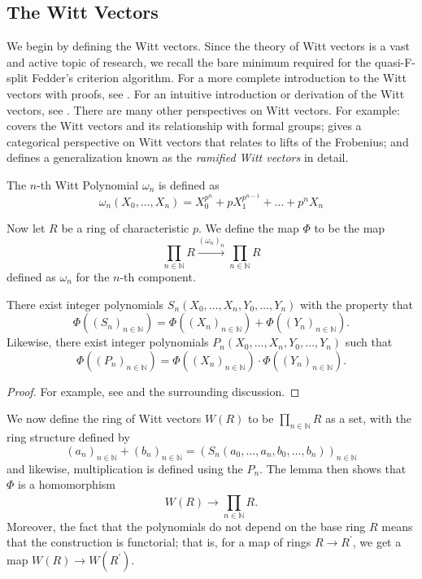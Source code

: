 
\subsection{The Witt Vectors}

We begin by defining the Witt vectors. 
Since the theory of Witt vectors is a vast and active topic of research,
we recall the bare minimum 
required for the quasi-F-split Fedder's criterion algorithm.
For a more complete introduction to the Witt vectors with proofs, 
see \cite{rabinoff-2014-witt-vec}.
For an intuitive introduction or derivation of the Witt vectors, see
\cite{kim-2017-witt-vec}.
There are many other perspectives on Witt vectors. 
For example:
\cite[Chapter~17]{hazewinkel-1978-formal-groups} covers the Witt vectors
and its relationship with formal groups; 
\cite{kedlaya-2021-prismatic} gives a categorical perspective on Witt vectors
that relates to lifts of the Frobenius; and
\cite[Chapter~1]{schneider-2017-galois-rep-phi-gamma} defines a generalization
known as the \textit{ramified Witt vectors} in detail.

\begin{defn}
	The \(n\)-th Witt Polynomial \(\omega_{n}\) is defined as
	\[
		\omega_{n}(X_{0}, \ldots, X_{n}) = X_{0}^{p^{n}} + pX_{1}^{p^{n-1}} + \ldots + p^{n}X_{n}
	\] 
\end{defn}

\noindent Now let \(R\) be a ring of characteristic \(p\).
We define the map \(\Phi\) to be the map 
\[
	\prod_{n \in \mathbb{N}}^{} R 
	\xrightarrow{(\omega_{n})_{n}} 
	\prod_{n \in \mathbb{N}}^{} R  
\] 
defined as \(\omega_{n}\) for the \(n\)-th component.

\begin{lem}
	There exist integer polynomials 
	\(S_n(X_{0}, \ldots, X_{n}, Y_{0}, \ldots, Y_{n})\) 
	with the property that 
	\[
		\Phi((S_{n})_{n \in \mathbb{N}}) =
		\Phi((X_{n})_{n \in \mathbb{N}}) 
		+ \Phi((Y_{n})_{n \in \mathbb{N}})
	.\] 
	Likewise, there exist integer polynomials 
	\(P_{n}(X_{0}, \ldots, X_{n}, Y_{0}, \ldots, Y_{n})\)
	such that
	\[
		\Phi((P_{n})_{n \in \mathbb{N}}) =
		\Phi((X_{n})_{n \in \mathbb{N}}) 
		\cdot \Phi((Y_{n})_{n \in \mathbb{N}})
	.\] 
\end{lem}

\begin{proof}
	For example, see \cite[Theorem~2.6]{rabinoff-2014-witt-vec} and the 
	surrounding discussion.
\end{proof}

We now define the ring of Witt vectors 
\(W(R)\) to be 
\(\prod_{n \in \mathbb{N}}^{} R \) 
as a set, with the ring structure defined
by 
\[
	(a_{n})_{n \in \mathbb{N}} + 
	(b_{n})_{n \in \mathbb{N}} =
	(S_{n}(a_{0}, \ldots, a_{n}, b_{0}, \ldots, b_{n}))_{n \in \mathbb{N}}
\] 
and likewise, multiplication is defined
using the \(P_{n}\).
The lemma then shows that \(\Phi\) is a homomorphism 
\[
	W(R) \xrightarrow{} \prod_{n \in \mathbb{N}}^{} R 
.\] 
Moreover, the fact that the polynomials do not depend on the base
ring \(R\) means that the construction is functorial; that is,
for a map of rings \(R \xrightarrow{} R^{\prime} \), we get a 
map \(W(R) \xrightarrow{} W(R^{\prime})\).

